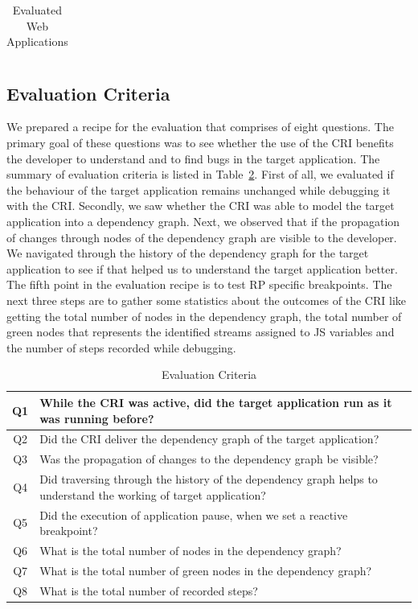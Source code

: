 \begin{table}[h!]
\begin{center}
\begin{tabular}{  |c|m{4cm}|c|c|c|c|m{2cm}|}
		
	
	\end{tabular}
\end{center}

\caption{Evaluated Web Applications}
\label{table:eval_web_apps}
\end{table}


\subsection{Evaluation Criteria}
We prepared a recipe for the evaluation that comprises of eight questions. The primary goal of these questions was to see whether the use of the CRI benefits the developer to understand and to find bugs in the target application. The summary of evaluation criteria is listed in Table~\ref{table:eval_criteria}. 
First of all, we evaluated if the behaviour of the target application remains unchanged while debugging it with the CRI.  Secondly, we saw whether the CRI was able to model the target application into a dependency graph. Next, we observed that if the propagation of changes through nodes of the dependency graph are visible to the developer.
We navigated through the history of the dependency graph for the target application to see if that helped us to understand the target application better. The fifth point in the evaluation recipe is to test RP specific breakpoints. 
The next three steps are to gather some statistics about the outcomes of the CRI like getting the total number of nodes in the dependency graph, the total number of green nodes that represents the identified streams assigned to JS variables and the number of steps recorded while debugging.



\begin{table}[h!]
\begin{center}
	\begin{tabular}{  |c|m{16cm}|}
		\hline
		Q1 & While the CRI was active, did the target application run as it was running before?  \\ \hline
		Q2 & Did the CRI deliver the dependency graph of the target application?  \\ \hline
		Q3 & Was the propagation of changes to the dependency graph be visible?  \\ \hline
		Q4 & Did traversing through the history of the dependency graph helps to understand the working of target application?  \\ \hline
		Q5 & Did the execution of application pause, when we set a reactive breakpoint?  \\ \hline
		Q6 & What is the total number of nodes in the dependency graph?  \\ \hline
		Q7 & What is the total number of green nodes in the dependency graph?  \\ \hline
		Q8 & What is the total number of recorded steps?  \\ \hline
	\end{tabular}
\end{center}
\caption{Evaluation Criteria}
\label{table:eval_criteria}
\end{table}
		
